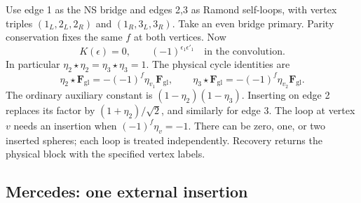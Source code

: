 \documentclass[11pt]{article}
\numberwithin{equation}{section}
\begin{document}
Use edge 1 as the NS bridge and edges 2,3 as Ramond self-loops, with vertex
triples $(1_L,2_L,2_R)$ and $(1_R,3_L,3_R)$. Take an even bridge primary.
Parity conservation fixes the same $f$ at both vertices. Now
\begin{equation}
 K(\epsilon)=0,
 \qquad (-1)^{\epsilon_1\epsilon'_1}
                 \quad\text{in the convolution}.
 \label{eq:glasses-specialization}
\end{equation}
In particular $\eta_2\star\eta_2=\eta_3\star\eta_3=1$.
The physical cycle identities are
\begin{equation}
 \eta_2\star\mathbf F_{\mathrm{gl}}
       =-(-1)^f\eta_{v_1}\mathbf F_{\mathrm{gl}},\qquad
 \eta_3\star\mathbf F_{\mathrm{gl}}
       =-(-1)^f\eta_{v_2}\mathbf F_{\mathrm{gl}}.
 \label{eq:glasses-sector}
\end{equation}
The ordinary auxiliary constant is $(1-\eta_2)(1-\eta_3)$.
Inserting on edge 2 replaces its factor by $(1+\eta_2)/\sqrt2$, and
similarly for edge 3. The loop at vertex $v$ needs an insertion when
$(-1)^f\eta_v=-1$.
There can be zero, one, or two inserted spheres; each loop is treated
independently. Recovery returns the physical block with the specified
vertex labels.

\subsection{Mercedes: one external insertion}
\end{document}

